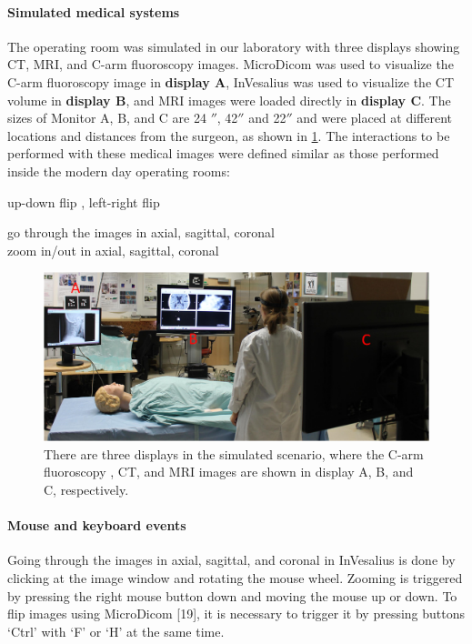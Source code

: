 {\paragraph{Simulated medical systems}
The operating room was simulated in our laboratory with three displays showing CT, MRI, and C-arm fluoroscopy images. 
MicroDicom\cite{Tangcharoen2011} was used to visualize the C-arm fluoroscopy image in \textbf{display A}, InVesalius\cite{Moraes2012} was used to visualize the CT volume in \textbf{display B}, and MRI images were loaded directly in \textbf{display C}. The sizes of Monitor A, B, and C are 24 $''$, 42$''$ and 22$''$ and were placed at different locations and distances from the surgeon, as shown in \figurename{\ref{fig:3-PointingOR:ORSEnvironment}}. The interactions to be performed with these medical images were defined similar as those performed inside the modern day operating rooms:
\begin{description}
	[align=right,style=nextline,leftmargin= 0.3\linewidth,labelsep=\parindent,font=\normalfont]
	\item [Fluoroscopy image:] up-down flip , left-right flip
	\item [CT \& MRI images:] go through the images in axial, sagittal, coronal\\ zoom in/out in axial, sagittal, coronal
\end{description}
\begin{figure}
	\includegraphics[width=1.0\textwidth]{figures/3-PointingOR/Displays.png}
	\caption{There are three displays in the simulated scenario, where the C-arm fluoroscopy , CT, and MRI images are shown in display A, B, and C, respectively.}
	\label{fig:3-PointingOR:ORSEnvironment}       %
\end{figure}
\paragraph{Mouse and keyboard events}
Going through the images in axial, sagittal, and coronal in InVesalius\cite{Moraes2012} is done by clicking at the image window and rotating the mouse wheel. Zooming is triggered by pressing the right mouse button down and moving the mouse up or down. To flip images using MicroDicom [19], it is necessary to trigger it by pressing buttons `Ctrl' with `F' or `H' at the same time. 

}
